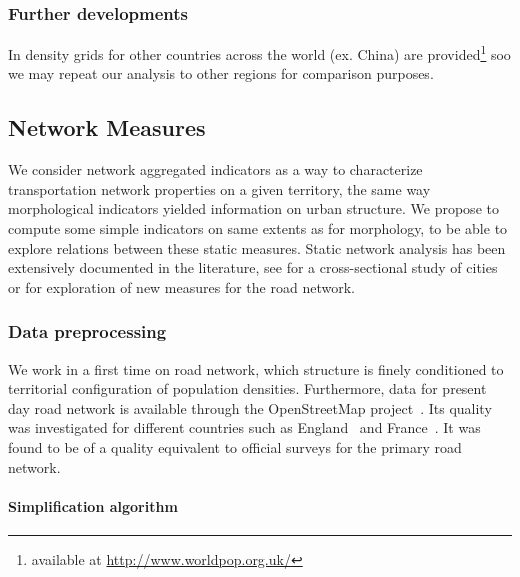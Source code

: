 \subsubsection{Further developments}

In \cite{10.1371/journal.pone.0107042} density grids for other countries across the world (ex. China) are provided\footnote{available at \url{http://www.worldpop.org.uk/}} soo we may repeat our analysis to other regions for comparison purposes.



\subsection{Network Measures}

We consider network aggregated indicators as a way to characterize transportation network properties on a given territory, the same way morphological indicators yielded information on urban structure. We propose to compute some simple indicators on same extents as for morphology, to be able to explore relations between these static measures. Static network analysis has been extensively documented in the literature, see \cite{louf2014typology} for a cross-sectional study of cities or \cite{2015arXiv151201268L} for exploration of new measures for the road network.


\subsubsection{Data preprocessing}

We work in a first time on road network, which structure is finely conditioned to territorial configuration of population densities. Furthermore, data for present day road network is available through the OpenStreetMap project~\cite{openstreetmap}. Its quality was investigated for different countries such as England~\cite{haklay2010good} and France~\cite{girres2010quality}. It was found to be of a quality equivalent to official surveys for the primary road network.



\paragraph{Simplification algorithm}

